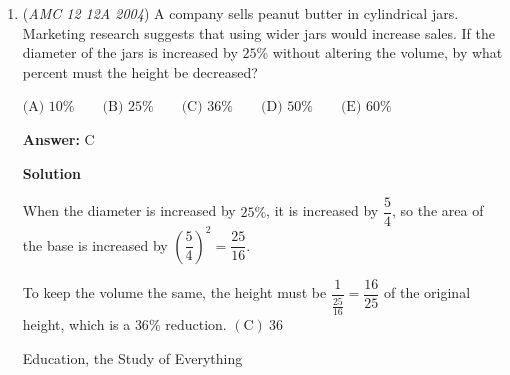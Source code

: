 \begin{enumerate}
 This means that $[\triangle BAE] - [\triangle ABC)] = [\triangle ADE] - [\triangle BDC]$ because $[\triangle ADB]$ cancels out, which can be seen easily in the diagram.

 $[\triangle BAE] = 0.5 \cdot 4 \cdot 8 = 16$
$[\triangle ABC] = 0.5 \cdot 4 \cdot 16 = 12$
$[\triangle BDC] - [\triangle ADE] = 16 - 12 =\boxed{\mathrm{(B)}\ 4}$




\textbf{Solution 6}

Looking at the diagram, here are the following observations:

 \begin{verbatim}
- Both have the same angles to the right and left of point D.- Line AE is perpendicular to AB, and so is BC perpendicular to AB, so AE and BC are parallel.- We see that triangle ADE is proportional, given that both widths are 4.
\end{verbatim}

The area of triangle BAE - triangle ABC = 4, and triangle ABD cancels out. Leaving the answer, d = 4.

 -By Thiagu Kannan

 Education, the Study of Everything

 


 


	\item (\textit{AMC 12 12A 2004}) A company sells peanut butter in cylindrical jars. Marketing research suggests that using wider jars would increase sales. If the diameter of the jars is increased by $25\%$ without altering the volume, by what percent must the height be decreased?


 $\text {(A) } 10\% \qquad \text {(B) } 25\% \qquad \text {(C) } 36\% \qquad \text {(D) } 50\% \qquad \text {(E) }60\%$

 \textbf{Answer: }C



\textbf{Solution}

When the diameter is increased by $25\%$, it is increased by $\dfrac{5}{4}$, so the area of the base is increased by $\left(\dfrac54\right)^2=\dfrac{25}{16}$.

 To keep the volume the same, the height must be $\dfrac{1}{\frac{25}{16}}=\dfrac{16}{25}$ of the original height, which is a $36\%$ reduction. $\boxed{\mathrm{(C)}\ 36}$

 Education, the Study of Everything

 



\end{enumerate}

